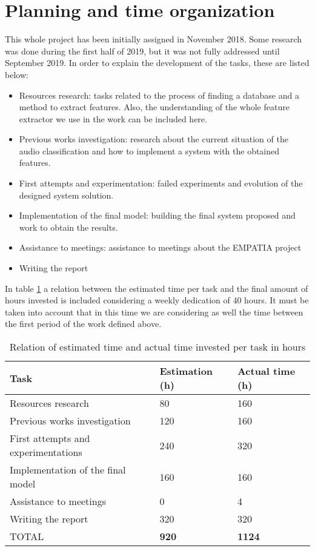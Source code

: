 
\section{Planning and time organization}

	This whole project has been initially assigned in November 2018. Some research was done during the first half of 2019, but it was not fully addressed until September 2019. In order to explain the development of the tasks, these are listed below:
	
	\begin{itemize}
		\item Resources research: tasks related to the process of finding a database and a method to extract features. Also, the understanding of the whole feature extractor we use in the work can be included here.
		\item Previous works investigation: research about the current situation of the audio classification and how to implement a system with the obtained features.
		\item First attempts and experimentation: failed experiments and evolution of the designed system solution.
		\item Implementation of the final model: building the final system proposed and work to obtain the results.
		\item Assistance to meetings: assistance to meetings about the EMPATIA project
		\item Writing the report
	\end{itemize}

	In table \ref{table:14} a relation between the estimated time per task and the final amount of hours invested is included considering a weekly dedication of 40 hours. It must be taken into account that in this time we are considering as well the time between the first period of the work defined above.
	
	\begin{table}[H]
		\begin{center}
			\begin{tabular}{|| m{10em} | m{7em} | m{7em} ||}
				\hline
				\textbf{Task} & \textbf{Estimation (h)} & \textbf{Actual time (h)} \\
				\hline\hline
				Resources research & 80 & 160 \\
				\hline
				Previous works investigation & 120 & 160 \\
				\hline
				First attempts and experimentations & 240 & 320 \\
				\hline
				Implementation of the final model & 160 & 160 \\
				\hline
				Assistance to meetings & 0 & 4 \\
				\hline
				Writing the report & 320 & 320 \\
				\hline
				TOTAL & \textbf{920} & \textbf{1124} \\
				\hline
			\end{tabular}
		\end{center}
		\caption{Relation of estimated time and actual time invested  per task in hours}
		\label{table:14}
	\end{table}



